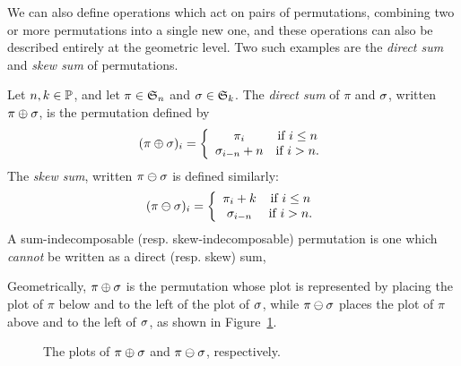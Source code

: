     
    We can also define operations which act on pairs of permutations, combining
    two or more permutations into a single new one, and these operations can
    also be described entirely at the geometric level.  Two such examples are
    the \emph{direct sum} and \emph{skew sum} of permutations. 

    \begin{definition} \label{prelim:def:sums}
      Let $n,k \in \Pos$, and let $\pi \in \S_n$ and $\sg \in \S_k$. The
      \emph{direct sum} of $\pi$ and $\sg$, written $\pi \dsum \sg$, is the
      permutation defined by 
      $$ (\pi \dsum \sg)_i = 
          \left\{ \begin{array}{cc} 
            \pi_i & \text{if} \ i \leq n \\
            \sg_{i-n} + n & \text{if} \ i > n. 
            \end{array} \right. $$
      The \emph{skew sum}, written $\pi \ssum \sg$ is defined similarly:
      $$ (\pi \ssum \sg)_i = 
          \left\{ \begin{array}{cc} 
            \pi_i + k & \text{if} \ i \leq n \\
            \sg_{i-n} & \text{if} \ i > n. 
            \end{array} \right. $$
      A sum-indecomposable (resp. skew-indecomposable) permutation is one which
      \emph{cannot} be written as a direct (resp. skew) sum,
    \end{definition}
    

    Geometrically, $\pi \dsum \sg$ is the permutation whose plot is represented
    by placing the plot of $\pi$ below and to the left of the plot of $\sg$,
    while $\pi \ssum \sg$ places the plot of $\pi$ above and to the left of
    $\sg$, as shown in Figure~\ref{prelim:fig:sums}.  

    \begin{figure}[t] \centering
      \hspace{4pc}

      \caption{The plots of $\pi \dsum \sg$ and $\pi \ssum \sg$, respectively.}
      \label{prelim:fig:sums}
    \end{figure}

